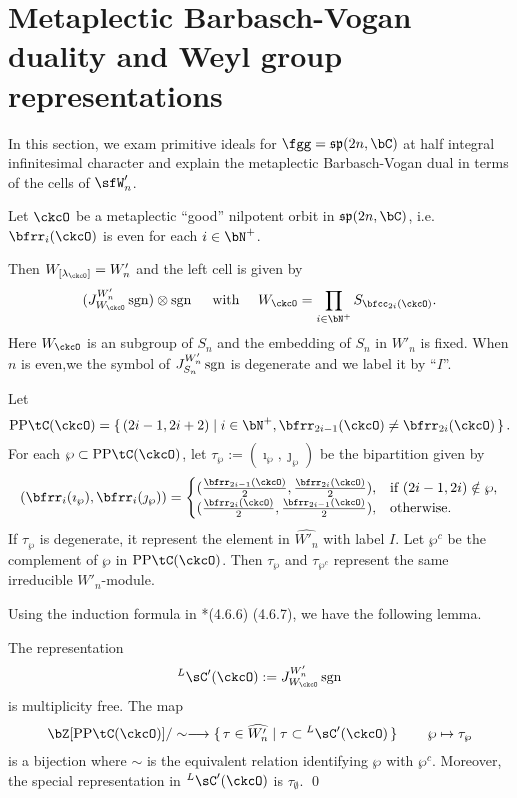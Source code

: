 \documentclass[counting_main.tex]{subfiles}
\begin{document}
\section{Metaplectic Barbasch-Vogan duality and Weyl group representations}

In this section, we exam primitive ideals for $\fgg=\fsp(2n,\bC)$ at half
integral infinitesimal character and explain the metaplectic Barbasch-Vogan dual
in terms of the cells of $\sfW'_{n}$.

Let $\ckcO$ be a metaplectic ``good'' nilpotent orbit in $\fsp(2n,\bC)$, i.e.
$\bfrr_i(\ckcO)$ is even for each $i\in \bN^+$.

Then $W_{[\lambda_{\ckcO}]} = W'_n$ and the left cell is given by
\[
(J_{W_\ckcO}^{W'_n} \sgn) \otimes \sgn \quad \text{ with } \quad W_\ckcO = \prod_{i\in \bN^+} S_{\bfcc_{2i}(\ckcO)}.
\]
Here $W_\ckcO$ is an subgroup of $S_n$ and the embedding of $S_n$ in $W'_n$ is fixed.
When $n$ is even,we the symbol of $J_{S_n}^{W'_n} \operatorname{sgn}$ is degenerate and we label it by ``$I$''.

\def\PPtC{\PP{\tC}}
 Let
 \[
  \PPtC(\ckcO) = \set{(2i-1,2i+2)|i\in \bN^+, \bfrr_{2i-1}(\ckcO)\neq \bfrr_{2i}(\ckcO)}.
 \]
  For each $\wp\subset \PPtC(\ckcO)$, let $\tau_\wp := (\imath_\wp,\jmath_\wp)$ be the bipartition
  given by
  \[
    (\bfrr_i(\imath_\wp),\bfrr_i(\jmath_\wp)) =\begin{cases}
      (\frac{\bfrr_{2i-1}(\ckcO)}{2}, \frac{\bfrr_{2i}(\ckcO)}{2}),   & \text{if } (2i-1,2i)\notin \wp, \\
      (\frac{\bfrr_{2i}(\ckcO)}{2}, \frac{\bfrr_{2i-1}(\ckcO)}{2}), & \text{otherwise.}
    \end{cases}
  \]
  If $\tau_\wp$ is degenerate, it represent the element in $\widehat{W'_n}$
  with label $I$.
  Let $\wp^c$ be the complement of $\wp$ in $\PPtC(\ckcO)$.
  Then $\tau_\wp$ and $\tau_{\wp^c}$ represent the same irreducible $W'_n$-module.

  \def\LCC{{}^L\sC'}
Using the induction formula in \cite{L}*{(4.6.6) (4.6.7)}, we have the following lemma.
\begin{lem}
The representation
\[
  \LCC(\ckcO) :=J_{W_\ckcO}^{W'_n} \sgn
\]
is multiplicity free.
The map
\[
  \bZ[\PPtC(\ckcO)]/\sim \longrightarrow \set{\tau\in \widehat{W'_n}| \tau\subset \LCC(\ckcO)}
  \qquad \wp \mapsto \tau_\wp
\]
is a bijection where $\sim$ is the equivalent relation identifying $\wp$ with $\wp^c$.
Moreover, the special representation in $\LCC(\ckcO)$ is $\tau_\emptyset$.
\qed
\end{lem}
\end{document}
